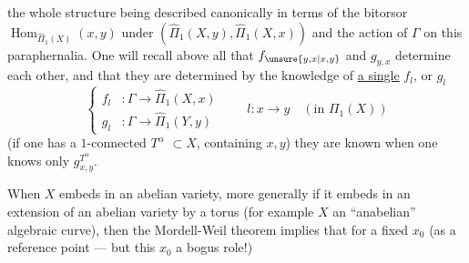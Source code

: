 the whole structure being described canonically in terms of the bitorsor $\operatorname{Hom}_{\widehat\Pi_1(X)}(x,y)$ under $(\widehat\Pi_1(X,y),\widehat\Pi_1(X,x))$ and the action of $\Gamma$ on  this paraphernalia. One will recall above all that $f_{\unsure{y,x|x,y}}$ and $g_{y,x}$ determine each other, and that they are determined by the knowledge of \uline{a single}   $f_l$, or $g_l$
\[
\tag{33}\left\{\begin{aligned}
f_l&:\Gamma\longrightarrow\widehat\Pi_1(X,x)\\
g_l&:\Gamma\longrightarrow\widehat\Pi_1(Y,y)
\end{aligned}\right.
\qquad l:x\longrightarrow y\quad(\text{in }\Pi_1(X))
\]
(if one has  a $1$-connected $T^\alpha$ $\subset X$, containing $x,y$) they are known when one knows only $g^{T^\alpha}_{x,y}$.


When $X$ embeds in an abelian variety, more generally if it embeds in an extension of an abelian variety by a torus (for example $X$ an ``anabelian'' algebraic curve), then the Mordell-Weil theorem implies that for a fixed $x_0$  (as a reference point --- but this $x_0$   a bogus role!)
